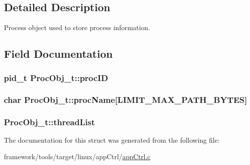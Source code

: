 \subsection{Detailed Description}
Process object used to store process information. 

\subsection{Field Documentation}
\subsubsection[{\texorpdfstring{proc\+ID}{procID}}]{\setlength{\rightskip}{0pt plus 5cm}pid\+\_\+t Proc\+Obj\+\_\+t\+::proc\+ID}\hypertarget{struct_proc_obj__t_a1e7495204a8ef803e847c261b76ae972}{}\label{struct_proc_obj__t_a1e7495204a8ef803e847c261b76ae972}
\subsubsection[{\texorpdfstring{proc\+Name}{procName}}]{\setlength{\rightskip}{0pt plus 5cm}char Proc\+Obj\+\_\+t\+::proc\+Name\mbox{[}{\bf L\+I\+M\+I\+T\+\_\+\+M\+A\+X\+\_\+\+P\+A\+T\+H\+\_\+\+B\+Y\+T\+ES}\mbox{]}}\hypertarget{struct_proc_obj__t_a3d77e32b6b4c5c132399f022abf006e1}{}\label{struct_proc_obj__t_a3d77e32b6b4c5c132399f022abf006e1}
\subsubsection[{\texorpdfstring{thread\+List}{threadList}}]{ Proc\+Obj\+\_\+t\+::thread\+List}\hypertarget{struct_proc_obj__t_a244afe61f947732dbf553ad90c9fe83b}{}\label{struct_proc_obj__t_a244afe61f947732dbf553ad90c9fe83b}


The documentation for this struct was generated from the following file\+:\begin{DoxyCompactItemize}
\item 
framework/tools/target/linux/app\+Ctrl/\hyperlink{app_ctrl_8c}{app\+Ctrl.\+c}\end{DoxyCompactItemize}
